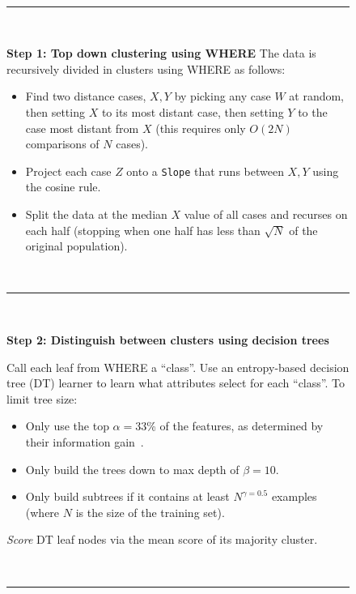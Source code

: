 \documentclass{sig-alternate}
\newcommand{\bi}{\begin{itemize}[leftmargin=0.4cm]}
\newcommand{\ei}{\end{itemize}}
\begin{document}
\begin{figure}[t]
	\small
	~\hrule~
	
	{\bf Step 1: Top down clustering using WHERE}
	The data is recursively divided in clusters using WHERE as follows:
	\begin{itemize}
		
		\item Find   two   distance cases,  $X,Y$
		by picking any case $W$ at random, then setting $X$ to its most
		distant case, then setting $Y$ to the case most distant from
		$X$
		(this requires only $O(2N)$ comparisons
		of $N$ cases).
		\item Project each case $Z$
		onto a {\tt Slope} that  runs between $X,Y$ using the cosine
		rule. 
		\item Split the data at the median $X$ value of all cases and
		recurses on each half  (stopping when
		one half has less  than $\sqrt{N}$ of the original population).
	\end{itemize}		
	
	~\hrule~
	
	{\bf Step 2: Distinguish between clusters using  decision trees}
	
	Call each leaf from WHERE a  ``class''. Use an entropy-based
	decision tree (DT) learner to learn what attributes select for each ``class''. To limit tree size:
	\bi
	\item Only use the top $\alpha=33$\%  of the features, as determined by their information gain~\cite{Irani1993}. 
	\item Only build the trees down to  max depth of $\beta=10$.
	\item Only build subtrees if it contains at least $N^{\gamma=0.5}$ examples (where $N$ is the size of the training set).
	\ei
	{\em Score}  DT  leaf nodes  via the mean score of its majority cluster. 
	
	~\hrule~
	

\end{figure}
\end{document}
